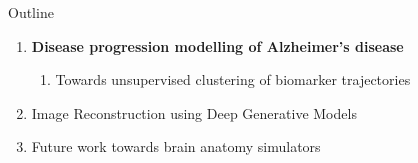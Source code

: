 \documentclass[8pt,xcolor=table,aspectratio=169]{beamer}
\begin{document}
\begin{frame}{Outline}

\begin{enumerate}
 \item \textbf{Disease progression modelling of Alzheimer's disease}
 \begin{enumerate} 
  \item Towards unsupervised clustering of biomarker trajectories\\
 \end{enumerate}
   
 
  
  \vt

 \item Image Reconstruction using Deep Generative Models\\
\brgmoursshort
\vt
 
  \item Future work towards brain anatomy simulators\\


\end{enumerate}
\end{frame}


 
\end{document}
